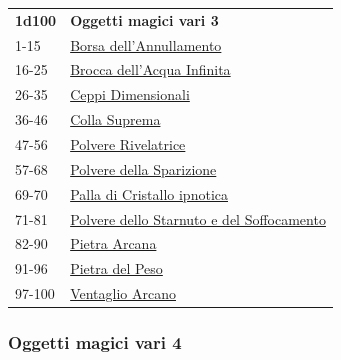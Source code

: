 \begin{multicols}{2}
{{\small\begin{tabularx}{0.45\textwidth}{lX}
\textbf{1d100} & \textbf{Oggetti magici vari 3}\\
1-15 & \hyperlink{Borsadell'Annullamento}{Borsa dell'Annullamento}\\
16-25 & \hyperlink{Broccadell'AcquaInfinita}{Brocca dell'Acqua Infinita}\\
26-35 & \hyperlink{CeppiDimensionali}{Ceppi Dimensionali}\\
36-46 & \hyperlink{CollaSuprema}{Colla Suprema}\\
47-56 & \hyperlink{PolvereRivelatrice}{Polvere Rivelatrice}\\
57-68 & \hyperlink{PolveredellaSparizione}{Polvere della Sparizione}\\
69-70 & \hyperlink{PalladiCristalloipnotica}{Palla di Cristallo ipnotica}\\
71-81 & \hyperlink{PolveredelloStarnutoedelSoffocamento}{Polvere dello Starnuto e del Soffocamento}\\
82-90 & \hyperlink{PietraArcana}{Pietra Arcana}\\
91-96 & \hyperlink{PietradelPeso}{Pietra del Peso}\\
97-100 & \hyperlink{VentaglioArcano}{Ventaglio Arcano}
\end{tabularx}}


\subsubsection{Oggetti magici vari 4}\hypertarget{Oggetti Magici Vari 4}{}

}
\end{multicols}
